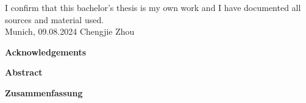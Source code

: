 \documentclass[11pt,
               a4paper,
               bibtotoc,
               idxtotoc,
               headsepline,
               footsepline,
               footexclude,
               BCOR12mm,
               DIV13,
               openany,   %
               ]
               {scrbook}
\def\doctype{Bachelor's Thesis\xspace}
\def\author{Chengjie Zhou}
\def\date{09.08.2024}
\begin{document}
\addtolength{\hoffset}{\bcorcor}
\newpage


\cleardoubleemptypage

\thispagestyle{empty}
\vspace*{0.7\textheight}
\noindent
I confirm that this \MakeLowercase{\doctype} is my own work and I have documented all sources and material used.\\

\vspace{15mm}
\noindent
Munich, \date \hspace{5cm} \author
\cleardoubleemptypage


{}
\vspace*{2cm}
\begin{center}
    {\Large \bf Acknowledgements}
\end{center}
\vspace{1cm}

\lipsum[1]

\cleardoublepage


{}
\vspace*{2cm}
\begin{center}
    {\Large \bf Abstract}
\end{center}
\vspace{1cm}

\lipsum[2]

\cleardoublepage

{}
\vspace*{2cm}
\begin{center}
    {\Large \bf Zusammenfassung}
\end{center}
\vspace{1cm}
\end{document}
